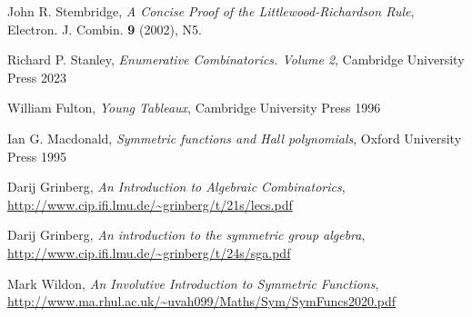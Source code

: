 \documentclass{article}
\begin{document}
\begin{thebibliography}{999999}
    \raggedright\footnotesize

    John R. Stembridge, 
    \textit{A Concise Proof of the Littlewood-Richardson Rule}, 
    Electron. J. Combin. \textbf{9} (2002), N5.

    Richard P. Stanley, 
    \textit{Enumerative Combinatorics. Volume 2}, 
    Cambridge University Press 2023

    William Fulton, 
    \textit{Young Tableaux}, 
    Cambridge University Press 1996

    Ian G. Macdonald,
    \textit{Symmetric functions and Hall polynomials}, 
    Oxford University Press 1995

    Darij Grinberg, 
    \textit{An Introduction to Algebraic Combinatorics}, 
    \url{http://www.cip.ifi.lmu.de/~grinberg/t/21s/lecs.pdf}

    Darij Grinberg, 
    \textit{An introduction to the symmetric group algebra}, 
    \url{http://www.cip.ifi.lmu.de/~grinberg/t/24s/sga.pdf}

    Mark Wildon, 
    \textit{An Involutive Introduction to Symmetric Functions},
    \url{http://www.ma.rhul.ac.uk/~uvah099/Maths/Sym/SymFuncs2020.pdf}
\end{thebibliography}
\end{document}

